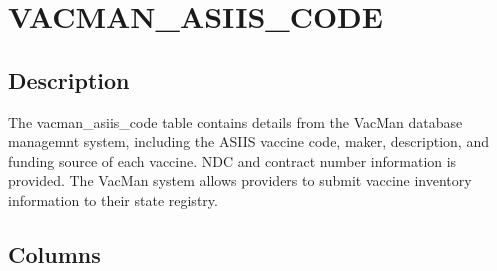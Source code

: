 \documentclass[
  letterpaper,
  DIV=11,
  numbers=noendperiod]{scrreprt}
\begin{document}
\hypertarget{vacman_asiis_code}{%
\chapter*{VACMAN\_ASIIS\_CODE}\label{vacman_asiis_code}}

\hypertarget{description-51}{%
\section*{Description}\label{description-51}}

The vacman\_asiis\_code table contains details from the VacMan database
managemnt system, including the ASIIS vaccine code, maker, description,
and funding source of each vaccine. NDC and contract number information
is provided. The VacMan system allows providers to submit vaccine
inventory information to their state registry.

\hypertarget{columns-51}{%
\section*{Columns}\label{columns-51}}
\end{document}
